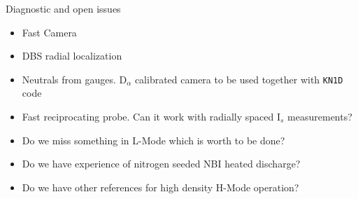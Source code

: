 \documentclass[10pt, compress]{beamer}
\newcommand\Fontvi{\fontsize{8}{7.2}\selectfont}
\begin{document}
        \begin{frame}{Diagnostic and open issues}
          \begin{itemize}
          \item Fast Camera
          \item DBS radial localization
          \item Neutrals from gauges. D$_{\alpha}$ calibrated camera
            to be used together with \texttt{KN1D} code
          \item Fast reciprocating probe. Can it work with radially
            spaced I$_s$ measurements?
          \item Do we miss something in L-Mode which is worth to be
            done?
          \item Do we have experience of nitrogen seeded NBI heated
            discharge?
          \item Do we have other references for high density H-Mode operation?
          \end{itemize}
        \end{frame}
        
\end{document}

